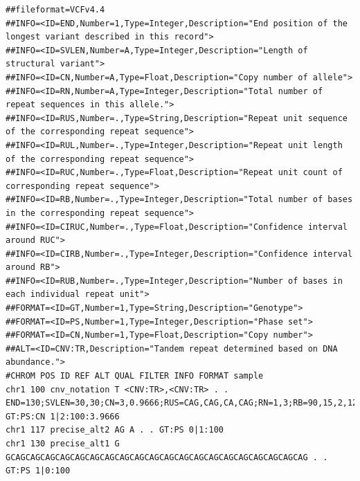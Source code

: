 \documentclass[8pt]{article}
\begin{document}
\pagebreak
\footnotesize
\begin{landscape}
\begin{verbatim}
##fileformat=VCFv4.4
##INFO=<ID=END,Number=1,Type=Integer,Description="End position of the longest variant described in this record">
##INFO=<ID=SVLEN,Number=A,Type=Integer,Description="Length of structural variant">
##INFO=<ID=CN,Number=A,Type=Float,Description="Copy number of allele">
##INFO=<ID=RN,Number=A,Type=Integer,Description="Total number of repeat sequences in this allele.">
##INFO=<ID=RUS,Number=.,Type=String,Description="Repeat unit sequence of the corresponding repeat sequence">
##INFO=<ID=RUL,Number=.,Type=Integer,Description="Repeat unit length of the corresponding repeat sequence">
##INFO=<ID=RUC,Number=.,Type=Float,Description="Repeat unit count of corresponding repeat sequence">
##INFO=<ID=RB,Number=.,Type=Integer,Description="Total number of bases in the corresponding repeat sequence">
##INFO=<ID=CIRUC,Number=.,Type=Float,Description="Confidence interval around RUC">
##INFO=<ID=CIRB,Number=.,Type=Integer,Description="Confidence interval around RB">
##INFO=<ID=RUB,Number=.,Type=Integer,Description="Number of bases in each individual repeat unit">
##FORMAT=<ID=GT,Number=1,Type=String,Description="Genotype">
##FORMAT=<ID=PS,Number=1,Type=Integer,Description="Phase set">
##FORMAT=<ID=CN,Number=1,Type=Float,Description="Copy number">
##ALT=<ID=CNV:TR,Description="Tandem repeat determined based on DNA abundance.">
#CHROM POS ID REF ALT QUAL FILTER INFO FORMAT sample
chr1 100 cnv_notation T <CNV:TR>,<CNV:TR> . . END=130;SVLEN=30,30;CN=3,0.9666;RUS=CAG,CAG,CA,CAG;RN=1,3;RB=90,15,2,12  GT:PS:CN 1|2:100:3.9666
chr1 117 precise_alt2 AG A . . GT:PS 0|1:100
chr1 130 precise_alt1 G GCAGCAGCAGCAGCAGCAGCAGCAGCAGCAGCAGCAGCAGCAGCAGCAGCAGCAGCAGCAG . . GT:PS 1|0:100
\end{verbatim}
\end{landscape}
\pagebreak
\normalsize
\end{document}
